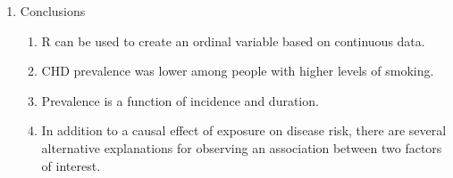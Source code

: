 \documentclass{article}
\begin{document}
\begin{enumerate}
\item Conclusions
\begin{enumerate}
  \item R can be used to create an ordinal variable based on continuous data. 
  \item CHD prevalence was lower among people with higher levels of smoking.
  \item Prevalence is a function of incidence and duration. 
  \item In addition to a causal effect of exposure on disease risk, there are several 
alternative explanations for observing an association between two factors of interest.
\end{enumerate}

\end{enumerate}
\end{document}
